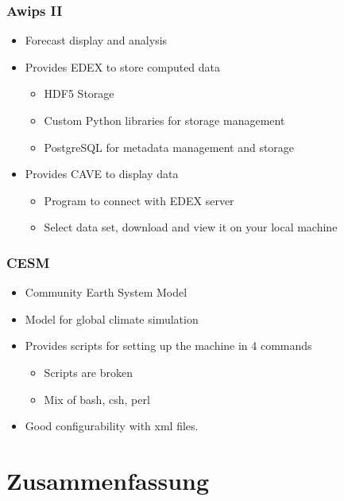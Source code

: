 \documentclass[compress]{beamer}
\begin{document}
\begin{frame}
    \frametitle{Awips II}
    	\begin{itemize}
			\item Forecast display and analysis
			\item Provides EDEX to store computed data
	    	\begin{itemize}
		    	\item HDF5 Storage
		    	\item Custom Python libraries for storage management
		    	\item PostgreSQL for metadata management and storage
		    \end{itemize}
		    \item Provides CAVE to display data
	    	\begin{itemize}
		    	\item Program to connect with EDEX server
		    	\item Select data set, download and view it on your local machine
		    \end{itemize}
		\end{itemize}
\end{frame}


\begin{frame}
    \frametitle{CESM}
    	\begin{itemize}
    	    \item Community Earth System Model
			\item Model for global climate simulation
			\item Provides scripts for setting up the machine in 4 commands
	    	\begin{itemize}
		    	\item Scripts are broken
		    	\item Mix of bash, csh, perl
		    \end{itemize}
		    \item Good configurability with xml files.
		\end{itemize}
\end{frame}


\section{Zusammenfassung}
\subsection*{}
\end{document}
